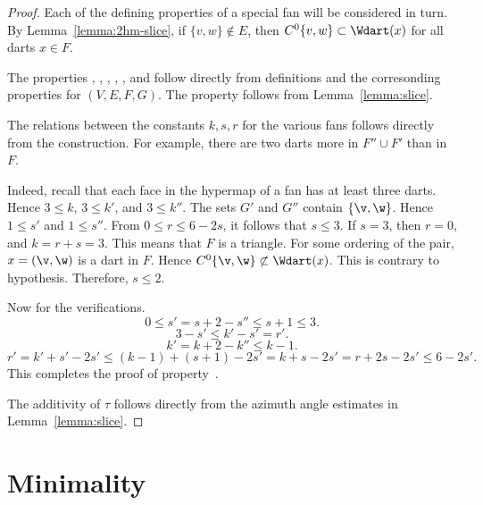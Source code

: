 \begin{proof} Each of the defining properties of a special fan will be
considered in turn.  By Lemma~\ref{lemma:2hm-slice}, if
$\{v,w\}\not\in E$, then $C^0\{v,w\}\subset \Wdart(x)$ for all darts
$x\in F$.

The properties , , ,
, , and  follow directly from
definitions and the corresonding properties for $(V,E,F,G)$.  The
property  follows from Lemma~\ref{lemma:slice}.

The relations between the constants $k,s,r$ for the various fans
follows directly from the construction.  For example, there are two
darts more in $F''\cup F'$ than in $F$.

  Indeed, recall that each face
in the hypermap of a fan has at least three darts.  Hence $3\le k$,
$3\le k'$, and $3\le k''$.  The sets $G'$ and $G''$ contain
$\{\v,\w\}$.  Hence $1\le s'$ and $1\le s''$.  From $0\le r\le 6 -
2s$, it follows that $s\le 3$.  If $s=3$, then $r=0$, and $k=r+s=3$.
This means that $F$ is a triangle.  For some ordering of the pair,
$x=(\v,\w)$ is a dart in $F$.  Hence $C^0\{\v,\w\} \not\subset
\Wdart(x)$.  This is contrary to hypothesis.  Therefore, $s\le 2$.

Now for the verifications.
\begin{displaymath}0\le s' = s + 2 - s'' \le s+1\le 3.\end{displaymath}
\begin{displaymath}3-s'\le k'-s' = r'.\end{displaymath}
\begin{displaymath}k' = k + 2 - k'' \le k-1.\end{displaymath}
\begin{displaymath}
  r'= k'+s' - 2 s' \le (k-1) + (s+1) - 2s' 
  =k+s - 2s' = r + 2s -2s' \le 6 - 2s'.
\end{displaymath}
This completes the proof of property~.

The additivity of $\tau$ follows directly from the azimuth angle
estimates in Lemma~\ref{lemma:slice}.
\end{proof}


\section{Minimality}



